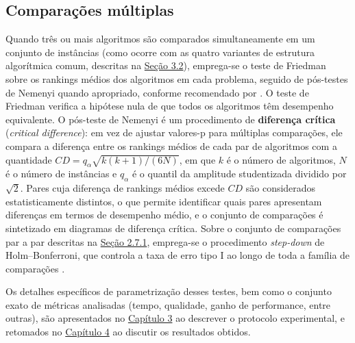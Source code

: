 \subsection{Comparações múltiplas}\label{sec-272-comparacoes-multiplas}

Quando três ou mais algoritmos são comparados simultaneamente em um conjunto de instâncias (como ocorre com as quatro variantes de estrutura algorítmica comum, descritas na \hyperref[obs-envelope-comparacao]{Seção 3.2}), emprega-se o teste de Friedman \autocite{friedman1937use} sobre os rankings médios dos algoritmos em cada problema, seguido de pós-testes de Nemenyi \autocite{nemenyi1963distribution} quando apropriado, conforme recomendado por \textcite{demsar2006statistical}.
O teste de Friedman verifica a hipótese nula de que todos os algoritmos têm desempenho equivalente.
O pós-teste de Nemenyi é um procedimento de \textbf{diferença crítica} (\emph{critical difference}): em vez de ajustar valores-p para múltiplas comparações, ele compara a diferença entre os rankings médios de cada par de algoritmos com a quantidade \(CD = q_{\alpha}\sqrt{k(k+1)/(6N)}\), em que \(k\) é o número de algoritmos, \(N\) é o número de instâncias e \(q_{\alpha}\) é o quantil da amplitude studentizada dividido por \(\sqrt{2}\).
Pares cuja diferença de rankings médios excede \(CD\) são considerados estatisticamente distintos, o que permite identificar quais pares apresentam diferenças em termos de desempenho médio, e o conjunto de comparações é sintetizado em diagramas de diferença crítica.
Sobre o conjunto de comparações par a par descritas na \hyperref[sec-271-comparacoes-pareadas]{Seção 2.7.1}, emprega-se o procedimento \emph{step-down} de Holm--Bonferroni, que controla a taxa de erro tipo I ao longo de toda a família de comparações \autocite{demsar2006statistical}.

Os detalhes específicos de parametrização desses testes, bem como o
conjunto exato de métricas analisadas (tempo, qualidade, ganho de
performance, entre outras), são apresentados no
\hyperref[cap3-materiais-metodos]{Capítulo 3} ao descrever o protocolo
experimental, e retomados no \hyperref[cap4-resultados]{Capítulo 4} ao
discutir os resultados obtidos.

